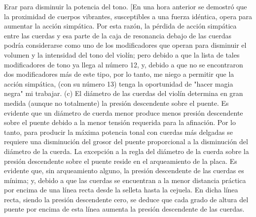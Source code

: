 Erar para disminuir la potencia del tono.
[En una hora anterior se demostró que la proximidad de cuerpos vibrantes, susceptibles a una fuerza idéntica, opera para aumentar la acción simpática. Por esta razón, la pérdida de acción simpática entre las cuerdas y esa parte de la caja de resonancia debajo de las cuerdas podría considerarse como uno de los modificadores que operan para disminuir el volumen y la intensidad del tono del violín; pero debido a que la lista de tales modificadores de tono ya llega al número 12, y, debido a que no se encontraron dos modificadores más de este tipo, por lo tanto, me niego a permitir que la acción simpática, (con su número 13) tenga la oportunidad de "hacer magia negra" mi
trabajar.
(c) El diámetro de las cuerdas del violín determina en gran medida (aunque no totalmente) la presión descendente sobre el puente. Es evidente que un diámetro de cuerda menor produce menos presión descendente sobre el puente debido a la menor tensión requerida para la afinación. Por lo tanto, para producir la máxima potencia tonal con cuerdas más delgadas se requiere una disminución del grosor del puente proporcional a la disminución del diámetro de la cuerda. La excepción a la regla del diámetro de la cuerda sobre la presión descendente sobre el puente reside en el arqueamiento de la placa. Es evidente que, sin arqueamiento alguno, la presión descendente de las cuerdas es mínima; y, debido a que las cuerdas se encuentran a la menor distancia práctica por encima de una línea recta desde la selleta hasta la cejuela. En dicha línea recta, siendo la presión descendente cero, se deduce que cada grado de altura del puente por encima de esta línea aumenta la presión descendente de las cuerdas.


